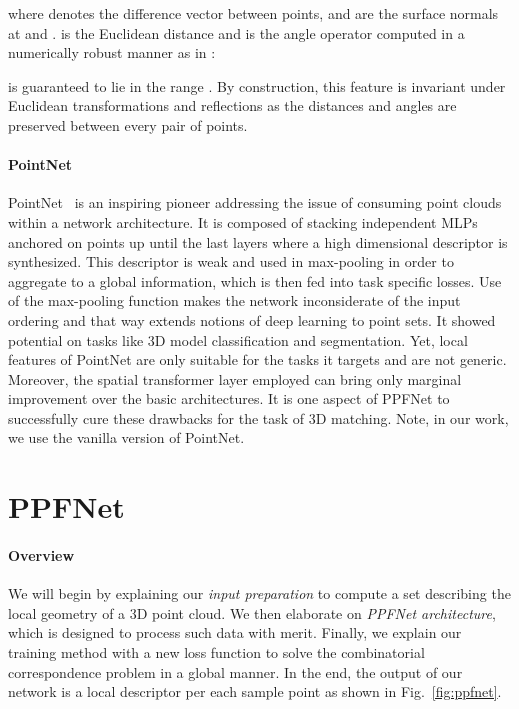 \documentclass[10pt,twocolumn,letterpaper]{article}
\theoremstyle{break}
\begin{document}
where  denotes the difference vector between points,  and  are the surface normals at  and .  is the Euclidean distance and  is the angle operator computed in a numerically robust manner as in \cite{birdal3dv2015}:

 is guaranteed to lie in the range . By construction, this feature is invariant under Euclidean transformations and reflections as the distances and angles are preserved between every pair of points. 
\vspace{-3mm}
\paragraph{PointNet}
PointNet~\cite{qi2016pointnet} is an inspiring pioneer addressing the issue of consuming point clouds within a network architecture. It is composed of stacking independent MLPs anchored on points up until the last layers where a high dimensional descriptor is synthesized. This descriptor is weak and used in max-pooling in order to aggregate to a global information, which is then fed into task specific losses. Use of the max-pooling function makes the network inconsiderate of the input ordering and that way extends notions of deep learning to point sets. It showed potential on tasks like 3D model classification and segmentation. Yet, local features of PointNet are only suitable for the tasks it targets and are not generic. Moreover, the spatial transformer layer employed can bring only marginal improvement over the basic architectures. It is one aspect of PPFNet to successfully cure these drawbacks for the task of 3D matching. Note, in our work, we use the vanilla version of PointNet.

\section{PPFNet}
\paragraph{Overview} We will begin by explaining our \textit{input preparation} to compute a set describing the local geometry of a 3D point cloud. We then elaborate on \textit{PPFNet architecture}, which is designed to process such data with merit. Finally, we explain our training method with a new loss function to solve the combinatorial correspondence problem in a global manner. In the end, the output of our network is a local descriptor per each sample point as shown in Fig.~\ref{fig:ppfnet}.
\end{document}

